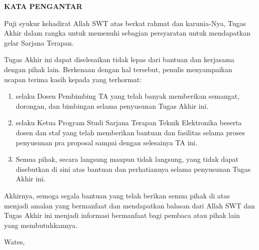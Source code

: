 
\clearpage
{}
{}
\begin{center}
    \textbf{\large KATA PENGANTAR}\\[3em]
\end{center}

Puji syukur kehadirat Allah SWT atas berkat rahmat dan karunia-Nya, Tugas Akhir dalam rangka untuk memenuhi sebagian persyaratan untuk mendapatkan gelar Sarjana Terapan.

Tugas Akhir ini dapat diselesaikan tidak lepas dari bantuan dan kerjasama dengan pihak lain. Berkenaan dengan hal tersebut, penulis menyampaikan ucapan terima kasih kepada yang terhormat:

\begin{enumerate}
    \item {\pembimbing} selaku Dosen Pembimbing TA yang telah banyak memberikan semangat, dorongan, dan bimbingan selama penyusunan Tugas Akhir ini.
    \item {\koorprodi} selaku Ketua Program Studi Sarjana Terapan Teknik Elektronika beserta dosen dan staf yang telah memberikan bantuan dan fasilitas selama proses penyusunan pra proposal sampai dengan selesainya TA ini.
    \item Semua pihak, secara langsung maupun tidak langsung, yang tidak dapat disebutkan di sini atas bantuan dan perhatiannya selama penyusunan Tugas Akhir ini.
\end{enumerate}

Akhirnya, semoga segala bantuan yang telah berikan semua pihak di atas menjadi amalan yang bermanfaat dan mendapatkan balasan dari Allah SWT dan Tugas Akhir ini menjadi informasi bermanfaat bagi pembaca atau pihak lain yang membutuhkannya.

\begin{flushright}
    Wates, \tglpengesahan\\[2cm]
    \penulis \\
    \nim
\end{flushright}

